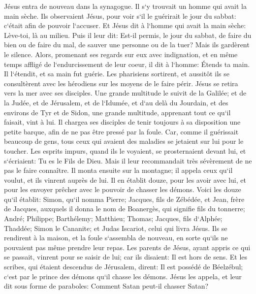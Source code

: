 \verse Jésus entra de nouveau dans la synagogue. Il s`y trouvait un homme qui avait la main sèche. 
\verse Ils observaient Jésus, pour voir s`il le guérirait le jour du sabbat: c`était afin de pouvoir l`accuser. 
\verse Et Jésus dit à l`homme qui avait la main sèche: Lève-toi, là au milieu. 
\verse Puis il leur dit: Est-il permis, le jour du sabbat, de faire du bien ou de faire du mal, de sauver une personne ou de la tuer? Mais ils gardèrent le silence. 
\verse Alors, promenant ses regards sur eux avec indignation, et en même temps affligé de l`endurcissement de leur coeur, il dit à l`homme: Étends ta main. Il l`étendit, et sa main fut guérie. 
\verse Les pharisiens sortirent, et aussitôt ils se consultèrent avec les hérodiens sur les moyens de le faire périr. 
\verse Jésus se retira vers la mer avec ses disciples. Une grande multitude le suivit de la Galilée; 
\verse et de la Judée, et de Jérusalem, et de l`Idumée, et d`au delà du Jourdain, et des environs de Tyr et de Sidon, une grande multitude, apprenant tout ce qu`il faisait, vint à lui. 
\verse Il chargea ses disciples de tenir toujours à sa disposition une petite barque, afin de ne pas être pressé par la foule. 
\verse Car, comme il guérissait beaucoup de gens, tous ceux qui avaient des maladies se jetaient sur lui pour le toucher. 
\verse Les esprits impurs, quand ils le voyaient, se prosternaient devant lui, et s`écriaient: Tu es le Fils de Dieu. 
\verse Mais il leur recommandait très sévèrement de ne pas le faire connaître. 
\verse Il monta ensuite sur la montagne; il appela ceux qu`il voulut, et ils vinrent auprès de lui. 
\verse Il en établit douze, pour les avoir avec lui, 
\verse et pour les envoyer prêcher avec le pouvoir de chasser les démons. 
\verse Voici les douze qu`il établit: Simon, qu`il nomma Pierre; 
\verse Jacques, fils de Zébédée, et Jean, frère de Jacques, auxquels il donna le nom de Boanergès, qui signifie fils du tonnerre; 
\verse André; Philippe; Barthélemy; Matthieu; Thomas; Jacques, fils d`Alphée; Thaddée; Simon le Cananite; 
\verse et Judas Iscariot, celui qui livra Jésus. 
\verse Ils se rendirent à la maison, et la foule s`assembla de nouveau, en sorte qu`ils ne pouvaient pas même prendre leur repas. 
\verse Les parents de Jésus, ayant appris ce qui se passait, vinrent pour se saisir de lui; car ils disaient: Il est hors de sens. 
\verse Et les scribes, qui étaient descendus de Jérusalem, dirent: Il est possédé de Béelzébul; c`est par le prince des démons qu`il chasse les démons. 
\verse Jésus les appela, et leur dit sous forme de paraboles: Comment Satan peut-il chasser Satan? 
